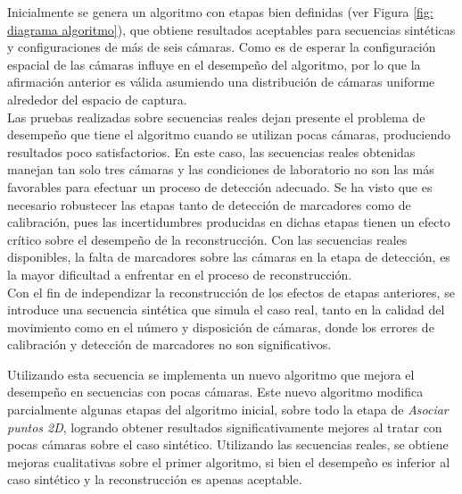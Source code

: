 Inicialmente se genera un algoritmo con etapas bien definidas (ver Figura \ref{fig: diagrama algoritmo}), que obtiene resultados aceptables para secuencias sintéticas y configuraciones de más de seis cámaras. Como es de esperar la configuración espacial de las cámaras influye en el desempeño del algoritmo, por lo que la afirmación anterior es válida asumiendo una distribución de cámaras uniforme alrededor del espacio de captura.\\


Las pruebas realizadas sobre secuencias reales dejan presente el problema de desempeño que tiene el algoritmo cuando se utilizan pocas cámaras, produciendo resultados poco satisfactorios. 
En este caso, las secuencias reales obtenidas manejan tan solo tres cámaras y las condiciones de laboratorio no son las más favorables para efectuar un proceso de detección adecuado. Se ha visto que es necesario robustecer las etapas tanto de detección de marcadores  como de calibración, pues las incertidumbres producidas en dichas etapas tienen un efecto crítico sobre el desempeño de la reconstrucción. Con las secuencias reales disponibles, la falta de marcadores sobre las cámaras en la etapa de detección, es la mayor dificultad a enfrentar en el proceso de reconstrucción. \\



Con el fin de independizar la reconstrucción de los efectos de etapas anteriores, se introduce una secuencia sintética que simula el caso real, tanto en la calidad del movimiento como en el número y disposición de cámaras, donde los errores de calibración y detección de marcadores no son significativos.


Utilizando esta secuencia se implementa un nuevo algoritmo que mejora el desempeño en secuencias con pocas cámaras. Este nuevo algoritmo modifica parcialmente algunas etapas del algoritmo inicial, sobre todo la etapa de \emph{Asociar puntos 2D}, logrando obtener resultados significativamente mejores al tratar con pocas cámaras sobre el caso sintético.
Utilizando las secuencias reales, se obtiene mejoras cualitativas sobre el primer algoritmo, si bien el desempeño es inferior al caso sintético y la reconstrucción es apenas aceptable.  \\ 


